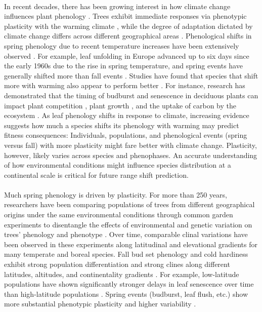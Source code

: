 \documentclass{article}
\begin{document}
\\
In recent decades, there has been growing interest in how climate change influences plant phenology \citep{Gill15}. Trees exhibit immediate responses via phenotypic plasticity with the warming climate \citep{Nicotra10}, while the degree of adaptation dictated by climate change differs across different geographical areas \citep{Loarie09}. Phenological shifts in spring phenology due to recent temperature increases have been extensively observed \citep{Parmesan06}. For example, leaf unfolding in Europe advanced up to six days since the early 1960s due to the rise in spring temperature, and spring events have generally shifted more than fall events \citep{menzel99}. Studies have found that species that shift more with warming also appear to perform better \citep{Gill15}. For instance, research has demonstrated that the timing of budburst and senescence in deciduous plants can impact plant competition \citep{fridley12}, plant growth \citep{myneni97}, and the uptake of carbon by the ecosystem \citep{Barichivich12}. As leaf phenology shifts in response to climate, increasing evidence suggests how much a species shifts its phenology with warming may predict fitness consequences: Individuals, populations, and phenological events (spring versus fall) with more plasticity might fare better with climate change. Plasticity, however, likely varies across species and phenophases. An accurate understanding of how environmental conditions might influence species distribution at a continental scale is critical for future range shift prediction. \\
\\
Much spring phenology is driven by plasticity. For more than 250 years, researchers have been comparing populations of trees from different geographical origins under the same environmental conditions through common garden experiments to disentangle the effects of environmental and genetic variation on trees’ phenology and phenotype \citep{AitkenBemmels16, Alberto13}. Over time, comparable clinal variations have been observed in these experiments along latitudinal and elevational gradients for many temperate and boreal species. Fall bud set phenology and cold hardiness exhibit strong population differentiation and strong clines along different latitudes, altitudes, and continentality gradients \citep{Alberto13}. For example, low-latitude populations have shown significantly stronger delays in leaf senescence over time than high-latitude populations \citep{Gill15}. Spring events (budburst, leaf flush, etc.) show more substantial phenotypic plasticity and higher variability \citep{AitkenBemmels16}.\\
\end{document}

